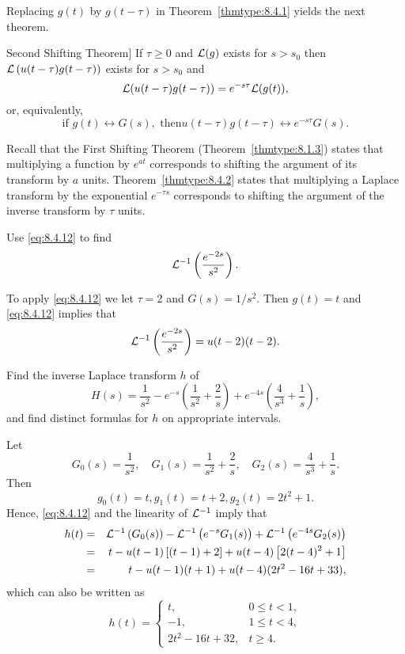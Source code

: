 \documentclass{ximera}
\begin{document}
Replacing $g(t)$ by $g(t-\tau)$ in Theorem~\ref{thmtype:8.4.1}
yields the next theorem.

\begin{theorem}Second Shifting
Theorem]\label{thmtype:8.4.2} If
 $\tau\geq 0$ and ${\cal L}(g)$ exists for $s>s_0$
then  ${\cal L}\left(u(t-\tau)g(t-\tau)\right)$ exists for $s>s_0$ and
$$
{\cal L}(u(t-\tau)g(t-\tau))=e^{-s\tau}{\cal L}(g(t)),
$$
or, equivalently,
\begin{equation}\label{eq:8.4.12}
\mbox{if } g(t)\leftrightarrow G(s),\mbox{ then
}u(t-\tau)g(t-\tau)\leftrightarrow e^{-s\tau}G(s).
\end{equation}
\end{theorem}

\begin{remark}
Recall that the First Shifting Theorem
(Theorem~\ref{thmtype:8.1.3}) states that multiplying a function  by
$e^{at}$ corresponds to shifting the argument of its transform by $a$
units. Theorem~\ref{thmtype:8.4.2} states that multiplying a Laplace
transform by the exponential $e^{-\tau s}$ corresponds to shifting the
argument of the inverse transform by $\tau$ units.
\end{remark}

\begin{example}\label{example:8.4.6}
 Use \eqref{eq:8.4.12} to find
$$
{\cal L}^{-1}\left(\frac{e^{-2s}}{s^2}\right).
$$
\begin{explanation}
To apply \eqref{eq:8.4.12} we let
$\tau=2$ and $G(s)=1/s^2$. Then $g(t)=t$ and \eqref{eq:8.4.12} implies that
$$
{\cal L}^{-1}\left(\frac{e^{-2s}}{s^2}\right)=u(t-2)(t-2).
$$
\end{explanation}
\end{example}

\begin{example}\label{example:8.4.7}
 Find the inverse Laplace transform $h$ of
$$
H(s)=\frac{1}{s^2}-e^{-s}\left(\frac{1}{s^2}+\frac{2}{s}\right)+
e^{-4s}\left(\frac{4}{s^3}+\frac{1}{s}\right),
$$
and find distinct formulas for $h$ on appropriate intervals.
\begin{explanation}
Let
$$
G_0(s)=\frac{1}{s^2},\quad G_1(s)=\frac{1}{s^2}+\frac{2}{s},\quad
G_2(s)=\frac{4}{s^3}+\frac{1}{ s}.
$$
Then
$$
g_0(t)=t, g_1(t)=t+2, g_2(t)=2t^2+1.
$$
Hence, \eqref{eq:8.4.12} and the linearity of ${\cal L}^{-1}$ imply that
\begin{eqnarray*}
h(t)&=&{\cal L}^{-1}\left(G_0(s)\right)-{\cal
L}^{-1}\left(e^{-s}G_1(s)\right)+{\cal
L}^{-1}\left(e^{-4s}G_2(s)\right)\\
&=&t-u(t-1)\left[(t-1)+2\right]+u(t-4)\left[2(t-4)^2+1\right]\\
&=&t-u(t-1)(t+1)+u(t-4)(2t^2-16t+33),
\end{eqnarray*}
which can also be written as
$$
h(t)=\left\{\begin{array}{cl}
 t,&0\leq t<1,\\
-1,&1\leq t<4,\\
2t^2-16t+32,&t\geq 4.
\end{array}\right.
$$
\end{explanation}
\end{example}
\end{document}
